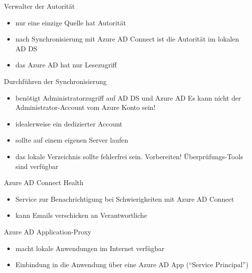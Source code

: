 \begin{flashcard}[Definition]{Verwalter der Autorität}
  \begin{itemize}
    \item nur eine einzige Quelle hat Autorität
    \item nach Synchronisierung mit Azure AD Connect ist die Autorität im lokalen AD DS
    \item das Azure AD hat nur Lesezugriff
  \end{itemize}
\end{flashcard}

\begin{flashcard}[Definition]{Durchführen der Synchronisierung}
  \begin{itemize}
    \item benötigt Administratorzugriff auf AD DS und Azure AD\newline
      Es kann nicht der Administrator-Account vom Azure Konto sein!
    \item idealerweise ein dedizierter Account
    \item sollte auf einem eigenen Server laufen
    \item das lokale Verzeichnis sollte fehlerfrei sein. Vorbereiten!\newline
      Überprüfungs-Tools sind verfügbar
  \end{itemize}
\end{flashcard}

\begin{flashcard}[Definition]{Azure AD Connect Health}
  \begin{itemize}
    \item Service zur Benachrichtigung bei Schwierigkeiten mit Azure AD Connect
    \item kann Emails verschicken an Verantwortliche
  \end{itemize}
\end{flashcard}

\begin{flashcard}[Definition]{Azure AD Application-Proxy}
  \begin{itemize}
    \item macht lokale Anwendungen im Internet verfügbar
    \item Einbindung in die Anwendung über eine Azure AD App (``Service Principal'')
  \end{itemize}
\end{flashcard}

